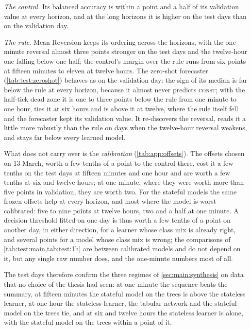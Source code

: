 \emph{The control.}  Its balanced accuracy is within a point and a half of its validation
value at every horizon, and at the long horizons it is higher on the test days than on the
validation day.

\emph{The rule.}  Mean Reversion keeps its ordering across the horizons, with the one-minute
reversal almost three points stronger on the test days and the twelve-hour one falling
below one half; the control's margin over the rule runs from six points at fifteen minutes
to eleven at twelve hours.  The zero-shot forecaster (\cref{tab:test:zeroshot}) behaves as on
the validation day: the sign of its median is far below the rule at every horizon, because it
almost never predicts \textsc{const}; with the half-tick dead zone it is one to three points
below the rule from one minute to one hour, ties it at six hours and is above it at twelve,
where the rule itself fell and the forecaster kept its validation value.  It re-discovers
the reversal, reads it a little more robustly than the rule on days when the twelve-hour
reversal weakens, and stays far below every learned model.

What does not carry over is the \emph{calibration} (\cref{tab:app:offsets}).  The offsets
chosen on 13 March, worth a few tenths of a point to the control there, cost it a few tenths
on the test days at fifteen minutes and one hour and are worth a few tenths at six and twelve
hours; at one minute, where they were worth more than five points in validation, they are
worth two.  For the stateful models the same frozen offsets help at every horizon, and most
where the model is worst calibrated: five to nine points at twelve hours, two and a half at
one minute.  A decision threshold fitted on one day is thus worth a few tenths of a point on
another day, in either direction, for a learner whose class mix is already right, and
several points for a model whose class mix is wrong; the comparisons of
\cref{tab:test:main,tab:test:1h} are between calibrated models and do not depend on it, but
any single raw number does, and the one-minute numbers most of all.

The test days therefore confirm the three regimes of \cref{sec:main:synthesis} on data that
no choice of the thesis had seen: at one minute the sequence beats the summary, at fifteen
minutes the stateful model on the trees is above the stateless learner, at one hour the
stateless learner, the tabular network and the stateful model on the trees tie, and at six
and twelve hours the stateless learner is alone, with the stateful model on the trees within
a point of it.
